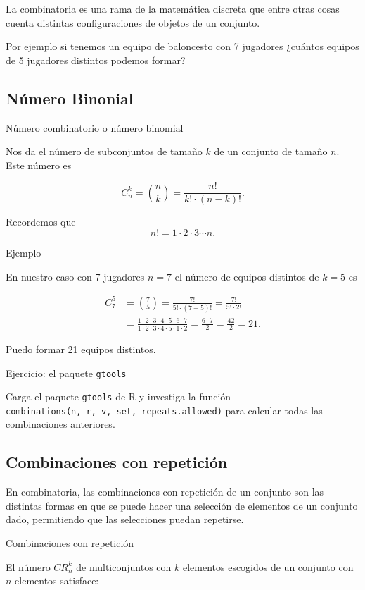 \documentclass[
  letterpaper,
  DIV=11,
  numbers=noendperiod]{scrreprt}
\begin{document}
La combinatoria es una rama de la matemática discreta que entre otras
cosas cuenta distintas configuraciones de objetos de un conjunto.

Por ejemplo si tenemos un equipo de baloncesto con 7 jugadores ¿cuántos
equipos de 5 jugadores distintos podemos formar?

\subsection{Número Binonial}\label{nuxfamero-binonial}

Número combinatorio o número binomial

Nos da el número de subconjuntos de tamaño \(k\) de un conjunto de
tamaño \(n\). Este número es

\[
C_n^k={n\choose k} = \frac{n!}{k!\cdot (n-k)!}.
\]

Recordemos que \[
n!=1\cdot 2\cdot 3\cdots n.
\]

Ejemplo

En nuestro caso con 7 jugadores \(n=7\) el número de equipos distintos
de \(k=5\) es

\[
\begin{array}{rl}
C_7^5&={7\choose 5} = \frac{7!}{5!\cdot (7-5)!}=\frac{7!}{5!\cdot 2!} \\
&=\frac{1\cdot 2\cdot 3 \cdot 4\cdot 5\cdot 6\cdot 7}{1\cdot 2\cdot 3 \cdot 4\cdot 5\cdot 1\cdot 2}=\frac{6\cdot 7}{2}=\frac{42}{2}=21.
\end{array}
\]

Puedo formar 21 equipos distintos.

Ejercicio: el paquete \texttt{gtools}

Carga el paquete \texttt{gtools} de R y investiga la función
\texttt{combinations(n,\ r,\ v,\ set,\ repeats.allowed)} para calcular
todas las combinaciones anteriores.

\subsection{Combinaciones con
repetición}\label{combinaciones-con-repeticiuxf3n}

En combinatoria, las combinaciones con repetición de un conjunto son las
distintas formas en que se puede hacer una selección de elementos de un
conjunto dado, permitiendo que las selecciones puedan repetirse.

Combinaciones con repetición

El número \(CR_n^k\) de multiconjuntos con \(k\) elementos escogidos de
un conjunto con \(n\) elementos satisface:
\end{document}
